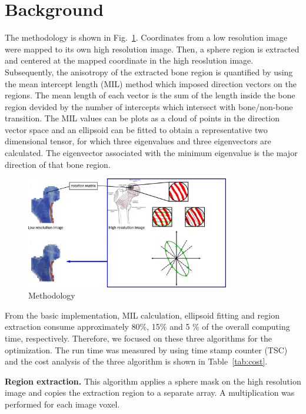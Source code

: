 \documentclass[letterpaper]{article}
\newcommand{\mypar}[1]{{\bf #1.}}
\begin{document}
\section{Background}\label{sec:background}
The methodology is shown in Fig.~\ref{fig:method}. Coordinates from a low resolution image were mapped to its own high resolution image. Then, a sphere region is extracted and centered at the mapped coordinate in the high reoslution image. 
Subsequently, the anisotropy of the extracted bone region is quantified by using the mean intercept length (MIL) method which imposed direction vectors on the regions. The mean length of each vector is the sum of the length inside the bone region devided by the number of intercepts which intersect with bone/non-bone transition.
The MIL values can be plots as a cloud of points in the direction vector space and an ellipsoid can be fitted to obtain a representative two dimensional tensor, for which three eigenvalues and three eigenvectors are calculated. The eigenvector associated with the minimum eigenvalue is the major direction of that bone region.

\begin{figure}[ht]
  \centering
  \includegraphics[width=3.5in]{figs/overview.png}
  \caption{Methodology}
  \label{fig:method}
\end{figure}

From the basic implementation, MIL calculation, ellipsoid fitting and region extraction consume approximately {\color{red} 80\%, 15\% and 5 \%} of the overall computing time, respectively. Therefore, we focused on these three algorithms for the optimization. The run time was measured by using time stamp counter (TSC) and the cost analysis of the three algorithm is shown in Table~\ref{tab:cost}.

\mypar{Region extraction}
This algorithm applies a sphere mask on the high resolution image and copies the extraction region to a separate array. A multiplication was performed for each image voxel.
\end{document}
